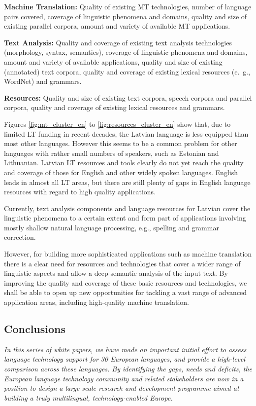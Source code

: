 \begin{multicols}{2}
\textbf{Machine Translation:} Quality of existing MT technologies, number of language pairs covered, coverage of linguistic phenomena and domains, quality and size of existing parallel corpora, amount and variety of available MT applications.

\textbf{Text Analysis:} Quality and coverage of existing text analysis technologies (morphology, syntax, semantics), coverage of linguistic phenomena and domains, amount and variety of available applications, quality and size of existing (annotated) text corpora, quality and coverage of existing lexical resources (e.~g., WordNet) and grammars.

\textbf{Resources:} Quality and size of existing text corpora, speech corpora and parallel corpora, quality and coverage of existing lexical resources and grammars.

Figures \ref{fig:mt_cluster_en} to \ref{fig:resources_cluster_en} show that, due to limited LT funding in recent decades, the Latvian language is less equipped than most other languages.
However this seems to be a common problem for other languages with rather small numbers of speakers, such as Estonian and Lithuanian.
Latvian LT resources and tools clearly do not yet reach the quality and coverage of those for English and other widely spoken languages.
English leads in almost all LT areas, but there are still plenty of gaps in English language resources with regard to high quality applications.

Currently, text analysis components and language resources for Latvian cover the linguistic phenomena to a certain extent and form part of applications involving mostly shallow natural language processing, e.g., spelling and grammar correction.

However, for building more sophisticated applications such as machine translation there is a clear need for resources and technologies that cover a wider range of linguistic aspects and allow a deep semantic analysis of the input text.
By improving the quality and coverage of these basic resources and technologies, we shall be able to open up new opportunities for tackling a vast range of advanced application areas, including high-quality machine translation. 

\subsection{Conclusions}

\emph{In this series of white papers, we have made an important initial effort to assess language technology support for 30 European languages, and provide a high-level comparison across these languages.
By identifying the gaps, needs and deficits, the European language technology community and related stakeholders are now in a position to design a large scale research and development programme aimed at building a truly multilingual, technology-enabled Europe.}


\end{multicols}
